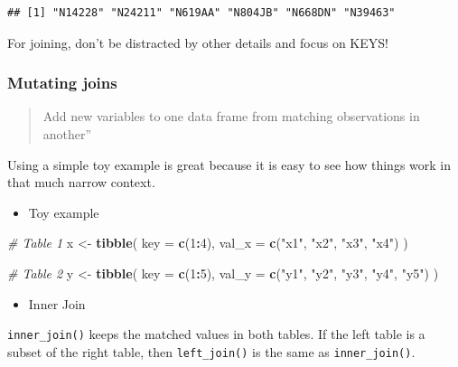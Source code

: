 \documentclass[
]{book}
\newenvironment{Shaded}{\begin{snugshade}}{\end{snugshade}}
\newcommand{\AttributeTok}[1]{\textcolor[rgb]{0.13,0.29,0.53}{#1}}
\newcommand{\CommentTok}[1]{\textcolor[rgb]{0.56,0.35,0.01}{\textit{#1}}}
\newcommand{\DecValTok}[1]{\textcolor[rgb]{0.00,0.00,0.81}{#1}}
\newcommand{\FunctionTok}[1]{\textcolor[rgb]{0.13,0.29,0.53}{\textbf{#1}}}
\newcommand{\NormalTok}[1]{#1}
\newcommand{\OtherTok}[1]{\textcolor[rgb]{0.56,0.35,0.01}{#1}}
\newcommand{\SpecialCharTok}[1]{\textcolor[rgb]{0.81,0.36,0.00}{\textbf{#1}}}
\newcommand{\StringTok}[1]{\textcolor[rgb]{0.31,0.60,0.02}{#1}}
\providecommand{\tightlist}{%
  \setlength{\itemsep}{0pt}\setlength{\parskip}{0pt}}
\begin{document}
\begin{verbatim}
## [1] "N14228" "N24211" "N619AA" "N804JB" "N668DN" "N39463"
\end{verbatim}

For joining, don't be distracted by other details and focus on KEYS!

\subsubsection{Mutating joins}\label{mutating-joins}

\begin{quote}
Add new variables to one data frame from matching observations in another''
\end{quote}

Using a simple toy example is great because it is easy to see how things work in that much narrow context.

\begin{itemize}
\tightlist
\item
  Toy example
\end{itemize}

\begin{Shaded}
\begin{Highlighting}[]
\CommentTok{\# Table 1}
\NormalTok{x }\OtherTok{\textless{}{-}} \FunctionTok{tibble}\NormalTok{(}
  \AttributeTok{key =} \FunctionTok{c}\NormalTok{(}\DecValTok{1}\SpecialCharTok{:}\DecValTok{4}\NormalTok{),}
  \AttributeTok{val\_x =} \FunctionTok{c}\NormalTok{(}\StringTok{"x1"}\NormalTok{, }\StringTok{"x2"}\NormalTok{, }\StringTok{"x3"}\NormalTok{, }\StringTok{"x4"}\NormalTok{)}
\NormalTok{)}

\CommentTok{\# Table 2}
\NormalTok{y }\OtherTok{\textless{}{-}} \FunctionTok{tibble}\NormalTok{(}
  \AttributeTok{key =} \FunctionTok{c}\NormalTok{(}\DecValTok{1}\SpecialCharTok{:}\DecValTok{5}\NormalTok{),}
  \AttributeTok{val\_y =} \FunctionTok{c}\NormalTok{(}\StringTok{"y1"}\NormalTok{, }\StringTok{"y2"}\NormalTok{, }\StringTok{"y3"}\NormalTok{, }\StringTok{"y4"}\NormalTok{, }\StringTok{"y5"}\NormalTok{)}
\NormalTok{)}
\end{Highlighting}
\end{Shaded}

\begin{itemize}
\tightlist
\item
  Inner Join
\end{itemize}

\texttt{inner\_join()} keeps the matched values in both tables. If the left table is a subset of the right table, then \texttt{left\_join()} is the same as \texttt{inner\_join()}.
\end{document}
